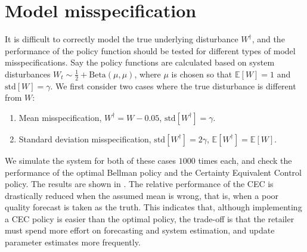 \documentclass[main.tex]{subfiles}
\begin{document}



\listoftodos

\section{Model
  misspecification}\label{sec:markdown_miss_specification}
It is difficult to correctly model the true underlying disturbance
$W^\dagger$, and the performance of the policy function should be
tested for different types of model misspecifications.
Say the policy functions are calculated based on
system disturbances $W_t\sim \frac{1}{2}+\mathrm{Beta}(\mu,\mu)$, where
$\mu$ is chosen so that $\mathbb E[W]=1$ and $\mbox{std}[W]=\gamma$.
We first consider two cases where the true disturbance is
different from $W$:
\begin{enumerate}
\item Mean misspecification, $W^\dagger = W-0.05$,
  $\mbox{std}[W^\dagger]=\gamma$.
\item Standard deviation misspecification, $\mbox{std}[W^\dagger] = 2\gamma$,
  $\mathbb E[W^\dagger] = \mathbb E[W]$.
\end{enumerate}
We simulate the system for both of these cases $1000$ times each,
and check the performance of the optimal Bellman policy and the
Certainty Equivalent Control policy. The results are shown in
.
The relative performance of the CEC is drastically reduced when the
assumed mean is wrong, that is, when a poor quality forecast is taken as
the truth. This indicates that, although implementing a CEC policy is
easier than the optimal policy, the trade-off is that the retailer
must spend more effort on forecasting and system estimation, and
update parameter estimates more frequently.
\end{document}
